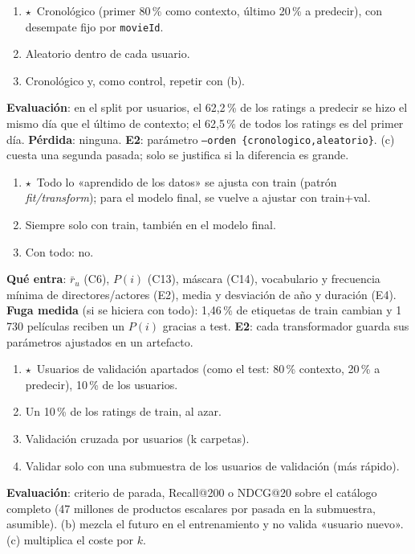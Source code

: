 \documentclass[a4paper,11pt]{article}
\newcommand{\rec}{\ensuremath{\star}}
\begin{document}
\begin{enumerate}[label=\alph*)]
  \item \rec\ Cronológico (primer 80\,\% como contexto, último 20\,\% a predecir), con desempate fijo por \texttt{movieId}.
  \item Aleatorio dentro de cada usuario.
  \item Cronológico y, como control, repetir con (b).
\end{enumerate}
\textbf{Evaluación}: en el split por usuarios, el 62,2\,\% de los ratings a predecir se hizo el mismo día que el último de contexto; el
62,5\,\% de todos los ratings es del primer día. \textbf{Pérdida}: ninguna. \textbf{E2}: parámetro \texttt{--orden \{cronologico,aleatorio\}}.
(c) cuesta una segunda pasada; solo se justifica si la diferencia es grande.

\begin{enumerate}[label=\alph*)]
  \item \rec\ Todo lo «aprendido de los datos» se ajusta con train (patrón \emph{fit/transform}); para el modelo final, se vuelve a ajustar con train+val.
  \item Siempre solo con train, también en el modelo final.
  \item Con todo: no.
\end{enumerate}
\textbf{Qué entra}: $\bar r_u$ (C6), $P(i)$ (C13), máscara (C14), vocabulario y frecuencia mínima de directores/actores (E2),
media y desviación de año y duración (E4). \textbf{Fuga medida} (si se hiciera con todo): 1,46\,\% de etiquetas de train cambian y
1\,730 películas reciben un $P(i)$ gracias a test. \textbf{E2}: cada transformador guarda sus parámetros ajustados en un artefacto.

\begin{enumerate}[label=\alph*)]
  \item \rec\ Usuarios de validación apartados (como el test: 80\,\% contexto, 20\,\% a predecir), 10\,\% de los usuarios.
  \item Un 10\,\% de los ratings de train, al azar.
  \item Validación cruzada por usuarios (k carpetas).
  \item Validar solo con una submuestra de los usuarios de validación (más rápido).
\end{enumerate}
\textbf{Evaluación}: criterio de parada, Recall@200 o NDCG@20 sobre el catálogo completo (47 millones de productos escalares por pasada en la
submuestra, asumible). (b) mezcla el futuro en el entrenamiento y no valida «usuario nuevo». (c) multiplica el coste por $k$.
\end{document}
